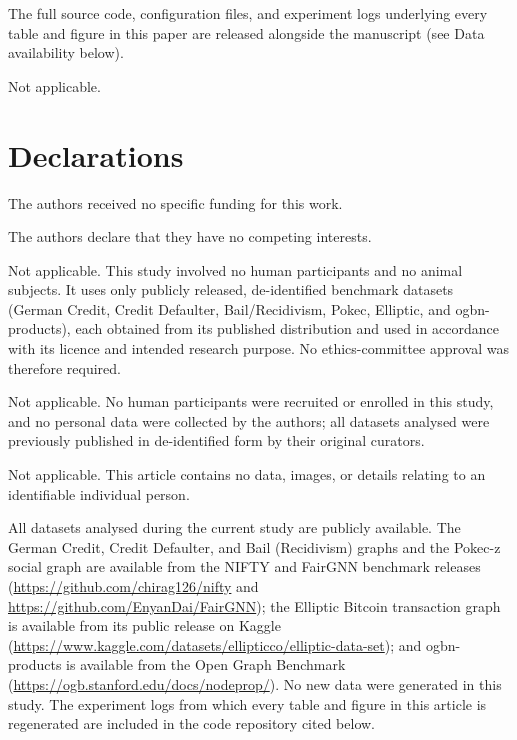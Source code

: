 \documentclass[pdflatex,sn-mathphys-num]{sn-jnl}
\theoremstyle{thmstyleone}%
\theoremstyle{thmstyletwo}%
\theoremstyle{thmstylethree}%
\begin{document}
\backmatter

The full source code, configuration files, and experiment logs underlying
every table and figure in this paper are released alongside the manuscript
(see Data availability below).

Not applicable.

\section*{Declarations}

The authors received no specific funding for this work.

The authors declare that they have no competing interests.

Not applicable. This study involved no human participants and no animal
subjects. It uses only publicly released, de-identified benchmark datasets
(German Credit, Credit Defaulter, Bail/Recidivism, Pokec, Elliptic, and
ogbn-products), each obtained from its published distribution and used in
accordance with its licence and intended research purpose. No ethics-committee
approval was therefore required.

Not applicable. No human participants were recruited or enrolled in this study,
and no personal data were collected by the authors; all datasets analysed were
previously published in de-identified form by their original curators.

Not applicable. This article contains no data, images, or details relating to an
identifiable individual person.

All datasets analysed during the current study are publicly available. The
German Credit, Credit Defaulter, and Bail (Recidivism) graphs and the Pokec-z
social graph are available from the NIFTY and FairGNN benchmark releases
(\url{https://github.com/chirag126/nifty} and
\url{https://github.com/EnyanDai/FairGNN}); the Elliptic Bitcoin transaction
graph is available from its public release on Kaggle
(\url{https://www.kaggle.com/datasets/ellipticco/elliptic-data-set}); and
ogbn-products is available from the Open Graph Benchmark
(\url{https://ogb.stanford.edu/docs/nodeprop/}). No new data were generated in
this study. The experiment logs from which every table and figure in this
article is regenerated are included in the code repository cited below.
\end{document}
